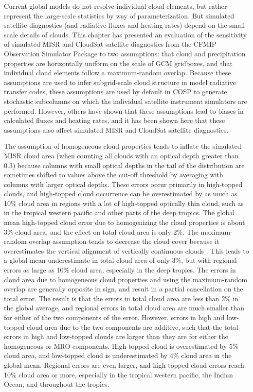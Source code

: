 Current global models do not resolve individual cloud elements, but
rather represent the large-scale statistics by way of parameterization.
But simulated satellite diagnostics (and radiative fluxes and heating
rates) depend on the small-scale details of clouds. This chapter has
presented an evaluation of the sensitivity of simulated MISR and
CloudSat satellite diagnostics from the CFMIP Observation Simulator
Package to two assumptions: that cloud and precipitation properties are
horizontally uniform on the scale of GCM gridboxes, and that individual
cloud elements follow a maximum-random overlap. Because these
assumptions are used to infer subgrid-scale cloud structure in model
radiative transfer codes, these assumptions are used by default in COSP
to generate stochastic subcolumns on which the individual satellite
instrument simulators are performed. However, others have shown that
these assumptions lead to biases in calculated fluxes and heating rates,
and it has been shown here that these assumptions also affect simulated
MISR and CloudSat satellite diagnostics.

The assumption of homogeneous cloud properties tends to inflate the
simulated MISR cloud area (when counting all clouds with an optical
depth greater than 0.3) because columns with small optical depths in the
tail of the distribution are sometimes shifted to values above the
cut-off threshold by averaging with columns with larger optical depths.
These errors occur primarily in high-topped clouds, and high-topped
cloud occurrence can be overestimated by as much as 10\% cloud area in
regions with a lot of high-topped optically thin cloud, such as in the
tropical western pacific and other parts of the deep tropics. The global
mean high-topped cloud error due to homogenizing the cloud properties is
about 3\% cloud area, and the effect on total cloud area is only 2\%.
The maximum-random overlap assumption tends to decrease the cloud cover
because it overestimates the vertical alignment of vertically continuous
clouds
\citep{mace_and_benson-troth_2002, hogan_and_illingworth_2000, barker_2008}.
This leads to a global mean underestimate in total cloud area of only
3\%, but with regional errors as large as 10\% cloud area, especially in
the deep tropics. The errors in cloud area due to homogeneous cloud
properties and using the maximum-random overlap are generally opposite
in sign, and result in a partial cancellation on the total error. The
result is that the errors in total cloud area are less than 2\% in the
global average, and regional errors in total cloud area are much smaller
than for either of the two components of the error. However, errors in
high and low-topped cloud area due to the two components are additive,
such that the total errors in high and low-topped clouds are larger than
they are for either the homogeneous or MRO components. High-topped cloud
is overestimated by 5\% cloud area, and low-topped cloud is
underestimated by 4\% cloud area in the global mean. Regional errors are
even larger, and high-topped cloud errors reach 10\% cloud area or more,
especially in the tropical western pacific, the Indian Ocean, and
throughout the tropics.


